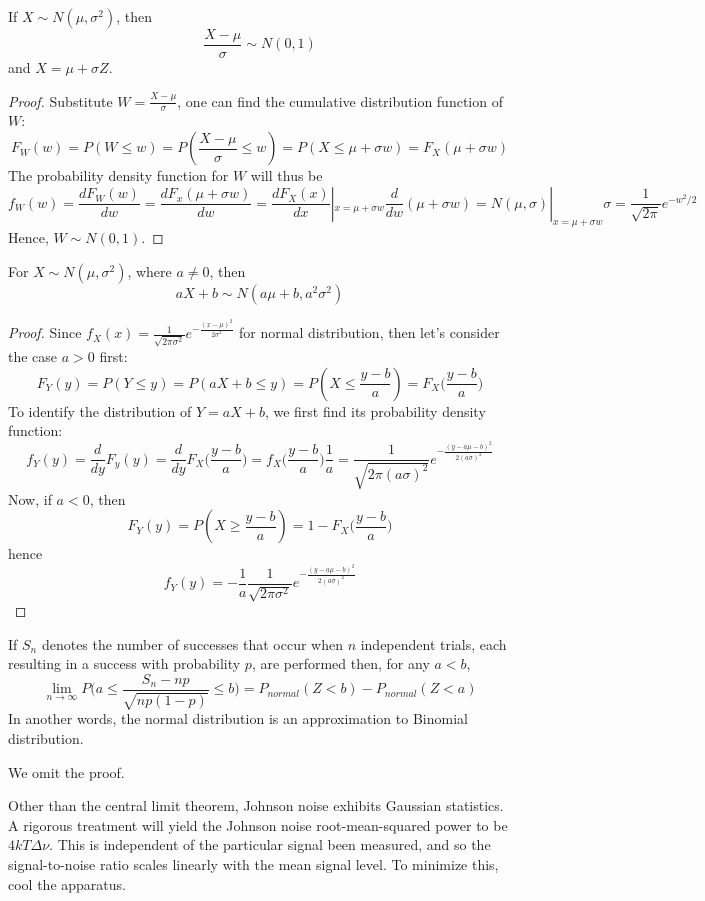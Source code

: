 \documentclass[a4paper]{article}
\begin{document}
\begin{thm}
If $X\sim N(\mu,\sigma^2)$, then 
$$\frac{X-\mu}{\sigma}\sim N(0,1)$$
and $X=\mu+\sigma Z$.
\end{thm}
\begin{proof}
Substitute $W=\frac{X-\mu}{\sigma}$, one can find the cumulative distribution function of $W$:
$$F_W(w)=P(W\leq w)=P(\frac{X-\mu}{\sigma}\leq w)=P(X\leq\mu+\sigma w)=F_X(\mu+\sigma w)$$
The probability density function for $W$ will thus be
$$f_W(w)=\frac{dF_W(w)}{dw}=\frac{dF_x(\mu+\sigma w)}{dw}=\frac{dF_X(x)}{dx}|_{x=\mu+\sigma w}\frac{d}{dw}(\mu+\sigma w)=N(\mu,\sigma)|_{x=\mu+\sigma w}\sigma=\frac{1}{\sqrt{2\pi}}e^{-w^2/2}$$
Hence, $W\sim N(0,1)$.
\end{proof}
\begin{thm}
For $X\sim N(\mu,\sigma^2)$, where $a\neq 0$, then
$$aX+b\sim N(a\mu+b,a^2\sigma^2)$$
\end{thm}
\begin{proof}
Since $f_X(x)=\frac{1}{\sqrt{2\pi\sigma^2}}e^{-\frac{(x-\mu)^2}{2\sigma^2}}$ for normal distribution, then let's consider the case $a>0$ first:
$$F_Y(y)=P(Y\leq y)=P(aX+b\leq y)=P(X\leq\frac{y-b}{a})=F_X\bigg(\frac{y-b}{a}\bigg)$$
To identify the distribution of $Y=aX+b$, we first find its probability density function:
$$f_Y(y)=\frac{d}{dy}F_y(y)=\frac{d}{dy}F_X\bigg(\frac{y-b}{a}\bigg)=f_X\bigg(\frac{y-b}{a}\bigg)\frac{1}{a}=\frac{1}{\sqrt{2\pi(a\sigma)^2}}e^{-\frac{(y-a\mu-b)^2}{2(a\sigma)^2}}$$
Now, if $a<0$, then
$$F_Y(y)=P(X\geq\frac{y-b}{a})=1-F_X\bigg(\frac{y-b}{a}\bigg)$$
hence
$$f_Y(y)=-\frac{1}{a}\frac{1}{\sqrt{2\pi\sigma^2}}e^{-\frac{(y-a\mu-b)^2}{2(a\sigma)^2}}$$
\end{proof}
\begin{thm}
If $S_n$ denotes the number of successes that occur when $n$ independent trials, each resulting in a  success with probability $p$, are performed then, for any $a<b$,
$$\lim_{n\rightarrow\infty}P\bigg(a\leq\frac{S_n-np}{\sqrt{np(1-p)}}\leq b\bigg)=P_{normal}(Z<b)-P_{normal}(Z<a)$$
In another words, the normal distribution is an approximation to Binomial distribution.
\end{thm}
We omit the proof.
\begin{Note}
Other than the central limit theorem, Johnson noise exhibits Gaussian statistics. A rigorous treatment will yield the Johnson noise root-mean-squared power to be $4kT\Delta\nu$. This is independent of the particular signal been measured, and so the signal-to-noise ratio scales linearly with the mean signal level. To minimize this, cool the apparatus.
\end{Note}
\end{document}
